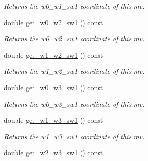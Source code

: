 \begin{DoxyCompactItemize}
\begin{DoxyCompactList}\small\item\em Returns the w0\-\_\-w1\-\_\-sw1 coordinate of this mv. \end{DoxyCompactList}\item 
\hypertarget{classe3ga_1_1mv_a99e557b158961f80c49730245cb1927a}{double \hyperlink{classe3ga_1_1mv_a99e557b158961f80c49730245cb1927a}{get\-\_\-w0\-\_\-w2\-\_\-sw1} () const }\label{classe3ga_1_1mv_a99e557b158961f80c49730245cb1927a}

\begin{DoxyCompactList}\small\item\em Returns the w0\-\_\-w2\-\_\-sw1 coordinate of this mv. \end{DoxyCompactList}\item 
\hypertarget{classe3ga_1_1mv_a0818daa58a21d73889249fd8c271c97b}{double \hyperlink{classe3ga_1_1mv_a0818daa58a21d73889249fd8c271c97b}{get\-\_\-w1\-\_\-w2\-\_\-sw1} () const }\label{classe3ga_1_1mv_a0818daa58a21d73889249fd8c271c97b}

\begin{DoxyCompactList}\small\item\em Returns the w1\-\_\-w2\-\_\-sw1 coordinate of this mv. \end{DoxyCompactList}\item 
\hypertarget{classe3ga_1_1mv_a15c4502c2dcd8053982ed22a0d14a03c}{double \hyperlink{classe3ga_1_1mv_a15c4502c2dcd8053982ed22a0d14a03c}{get\-\_\-w0\-\_\-w3\-\_\-sw1} () const }\label{classe3ga_1_1mv_a15c4502c2dcd8053982ed22a0d14a03c}

\begin{DoxyCompactList}\small\item\em Returns the w0\-\_\-w3\-\_\-sw1 coordinate of this mv. \end{DoxyCompactList}\item 
\hypertarget{classe3ga_1_1mv_afe70024b77764df59710802147b8740e}{double \hyperlink{classe3ga_1_1mv_afe70024b77764df59710802147b8740e}{get\-\_\-w1\-\_\-w3\-\_\-sw1} () const }\label{classe3ga_1_1mv_afe70024b77764df59710802147b8740e}

\begin{DoxyCompactList}\small\item\em Returns the w1\-\_\-w3\-\_\-sw1 coordinate of this mv. \end{DoxyCompactList}\item 
\hypertarget{classe3ga_1_1mv_a768526a249cea7a9ef1b5aeccf8a302f}{double \hyperlink{classe3ga_1_1mv_a768526a249cea7a9ef1b5aeccf8a302f}{get\-\_\-w2\-\_\-w3\-\_\-sw1} () const }\label{classe3ga_1_1mv_a768526a249cea7a9ef1b5aeccf8a302f}


\end{DoxyCompactItemize}
